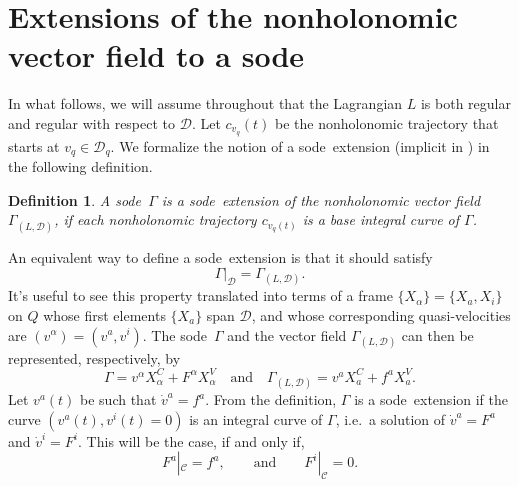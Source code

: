 \documentclass[11pt]{article}
\newtheorem{defi}{Definition}
\def\sode{{\sc sode}}
\def\D{{\mathcal D}}
\begin{document}
\section{Extensions of the nonholonomic vector field to a \sode} \label{sec3}



In what follows, we will  assume throughout that  the Lagrangian $L$ is both regular and regular with respect to $\D$.  
Let $c_{v_q}(t)$ be the nonholonomic trajectory that starts at $v_q\in \D_q$.  We formalize the notion of a \sode\ extension (implicit in  \cite{firstnonholexp,Simoes})  in the following  definition.




\begin{defi} A \sode\ $\Gamma$   is a \sode\ extension of the nonholonomic vector field $\Gamma_{(L,\mathcal{D})}$, if each nonholonomic trajectory $c_{v_q(t)}$ is a base integral curve of $\Gamma$.\label{defi:dfn}
\end{defi}


An equivalent way to define a \sode\ extension is that it should satisfy
\[
\Gamma|_\mathcal{D}=\Gamma_{(L,\mathcal{D})}.
\]
It's   useful to see this property translated into terms of a frame  $\{X_\alpha\}=\{X_a,X_i\}$ on $Q$ whose first elements $\{X_a\}$ span $\D$, and whose corresponding quasi-velocities are $(v^\alpha)=(v^a,v^i)$. The \sode\ $\Gamma$ and the vector field $\Gamma_{(L,\mathcal{D})}$  can then be represented, respectively, by
\[\Gamma=v^\alpha X_\alpha^C+F^\alpha X_\alpha^V \quad\mbox{and}\quad \Gamma_{(L,\mathcal{D})}=v^a X_a^C+ f^a X_a^V.
\]
Let $v^a(t)$ be such that $\dot{v}^a=f^a$. From the definition, $\Gamma$ is a \sode\ extension   if  the curve $(v^a(t),v^i(t)=0)$ is an integral curve of $\Gamma$, i.e.\ a solution of  $\dot{v}^a=F^a$ and $\dot{v}^i=F^i$. This will be the case, if and only if, 
\[
    F^a|_\mathcal{C}=f^a,\qquad \mbox{and} \qquad
    F^i|_\mathcal{C}=0.
 \] 
\end{document}
